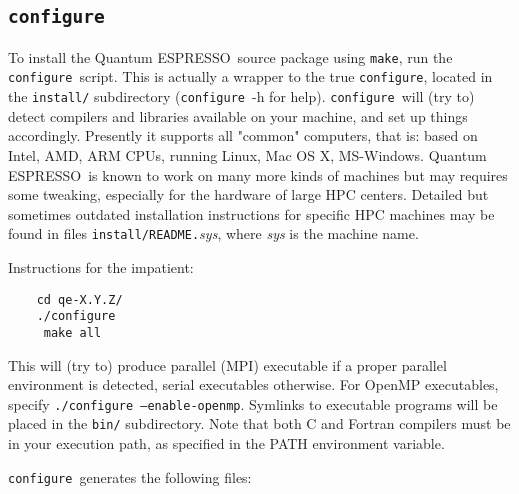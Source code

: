 \documentclass[12pt,a4paper]{article}
\def\qe{{\sc Quantum ESPRESSO}}
\def\configure{\texttt{configure}}
\def\make{\texttt{make}}
\begin{document}
\subsection{\configure}

To install the \qe\ source package using \make, run the \configure{}ript. This is actually a wrapper to the true \configure,
located in the \texttt{install/} subdirectory (\configure\ -h for help).
\configure\ will (try to) detect compilers and libraries available on
your machine, and set up things accordingly. Presently it supports
all "common" computers, that is: based on Intel, AMD, ARM CPUs,
running Linux, Mac OS X, MS-Windows. \qe\ is known to work on many
more kinds of machines but may requires some tweaking, especially for
the hardware of large HPC centers. Detailed but sometimes outdated
installation instructions for specific HPC machines may be found in
files \texttt{install/README.}{\em sys}, where {\em sys} is the machine name.

Instructions for the impatient:
\begin{verbatim}
    cd qe-X.Y.Z/
    ./configure
     make all
\end{verbatim}
This will (try to) produce parallel (MPI) executable if a proper parallel
environment is detected, serial executables otherwise. For OpenMP executables,
specify \texttt{./configure --enable-openmp}. Symlinks to executable programs
will be placed in the \texttt{bin/}
subdirectory. Note that both C and Fortran compilers must be in your execution
path, as specified in the PATH environment variable.

\noindent \configure\ generates the following files:
\end{document}
